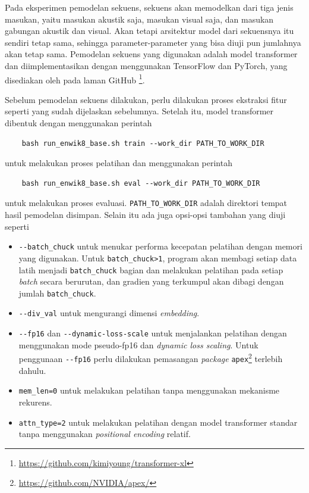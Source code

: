 Pada eksperimen pemodelan sekuens, sekuens akan memodelkan dari tiga jenis masukan, yaitu masukan akustik saja, masukan visual saja, dan masukan gabungan akustik dan visual. Akan tetapi arsitektur model dari sekuensnya itu sendiri tetap sama, sehingga parameter-parameter yang bisa diuji pun jumlahnya akan tetap sama. Pemodelan sekuens yang digunakan adalah model transformer dan diimplementasikan dengan menggunakan TensorFlow dan PyTorch, yang disediakan oleh \textcite{Dai2019} pada laman GitHub \footnote{\url{https://github.com/kimiyoung/transformer-xl}}.
\bigskip

Sebelum pemodelan sekuens dilakukan, perlu dilakukan proses ekstraksi fitur seperti yang sudah dijelaskan sebelumnya. Setelah itu, model transformer dibentuk dengan menggunakan perintah

\begin{verbatim}
    bash run_enwik8_base.sh train --work_dir PATH_TO_WORK_DIR
\end{verbatim}

untuk melakukan proses pelatihan dan menggunakan perintah

\begin{verbatim}
    bash run_enwik8_base.sh eval --work_dir PATH_TO_WORK_DIR
\end{verbatim}

untuk melakukan proses evaluasi. \verb|PATH_TO_WORK_DIR| adalah direktori tempat hasil pemodelan disimpan. Selain itu ada juga opsi-opsi tambahan yang diuji seperti 
\begin{itemize}
    \item \verb|--batch_chuck| untuk menukar performa kecepatan pelatihan dengan memori yang digunakan. Untuk \verb|batch_chuck>1|, program akan membagi setiap data latih menjadi \verb|batch_chuck| bagian dan melakukan pelatihan pada setiap \textit{batch} secara berurutan, dan gradien yang terkumpul akan dibagi dengan jumlah \verb|batch_chuck|.
    \item \verb|--div_val| untuk mengurangi dimensi \textit{embedding}.
    \item \verb|--fp16| dan \verb|--dynamic-loss-scale| untuk menjalankan pelatihan dengan menggunakan mode pseudo-fp16 dan \textit{dynamic loss scaling}. Untuk penggunaan \verb|--fp16| perlu dilakukan pemasangan \textit{package} \verb|apex|\footnote{\url{https://github.com/NVIDIA/apex/}} terlebih dahulu.
    \item \verb|mem_len=0| untuk melakukan pelatihan tanpa menggunakan mekanisme rekurens.
    \item \verb|attn_type=2| untuk melakukan pelatihan dengan model transformer standar tanpa menggunakan \textit{positional encoding} relatif.
\end{itemize}

